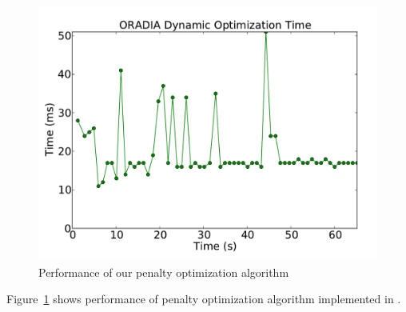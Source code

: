 \begin{figure}[!t]
	\begin{center}	
		\includegraphics[bb=0 0 576 432,width=\columnwidth]{opt_time.pdf}
		\caption{Performance of our penalty optimization algorithm}
		\label{optimization_perf}
	\end{center}
\end{figure}

Figure~\ref{optimization_perf} shows performance of penalty optimization algorithm implemented in \tess.  

